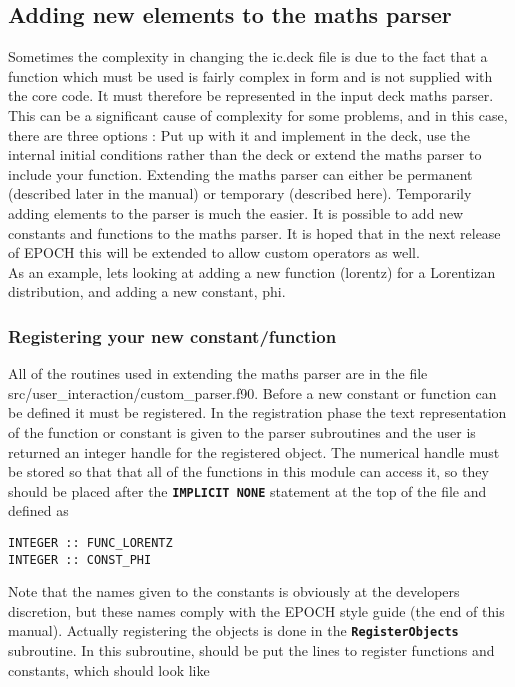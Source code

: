\documentclass[12pt]{article}
\newcommand{\simpleboxverbatim}{\begin{Verbatim}[obeytabs=true,frame=single,
  framerule=0.5mm,rulecolor=\color{warwickmid}]}
\newcommand{\inlinecode}[1]{{\color{warwickred} \bf\texttt{#1}}}
\newcommand{\nEPOCH}{{\color{warwickdark}\fontfamily{phv}\selectfont EPOCH}}
\newcommand{\EPOCH}{{\nEPOCH} }
\begin{document}
\subsection{Adding new elements to the maths parser}
Sometimes the complexity in changing the ic.deck file is due to the fact that
a function which must be used is fairly complex in form and is not supplied
with the core code. It must therefore be represented in the input deck maths
parser. This can be a significant cause of complexity for some problems, and
in this case, there are three options : Put up with it and implement in the
deck, use the internal initial conditions rather than the deck or extend the
maths parser to include your function. Extending the maths parser can either
be permanent (described later in the manual) or temporary (described
here). Temporarily adding elements to the parser is much the easier. It is
possible to add new constants and functions to the maths parser. It is hoped
that in the next release of \EPOCH this will be extended to allow custom
operators as well.\\

As an example, lets looking at adding a new function (lorentz) for a
Lorentizan distribution, and adding a new constant, phi.

\subsubsection{Registering your new constant/function}
All of the routines used in extending the maths parser are in the file
src/user\_interaction/custom\_parser.f90.  Before a new constant or function
can be defined it must be registered. In the registration phase the text
representation of the function or constant is given to the parser subroutines
and the user is returned an integer handle for the registered object. The
numerical handle must be stored so that that all of the functions in this
module can access it, so they should be placed after the \inlinecode{IMPLICIT
NONE} statement at the top of the file and defined as

\simpleboxverbatim
INTEGER :: FUNC_LORENTZ
INTEGER :: CONST_PHI
\end{Verbatim}

Note that the names given to the constants is obviously at the developers
discretion, but these names comply with the \EPOCH style guide (the end of
this manual). Actually registering the objects is done in the
\inlinecode{RegisterObjects} subroutine. In this subroutine, should be put the
lines to register functions and constants, which should look like
\end{document}
